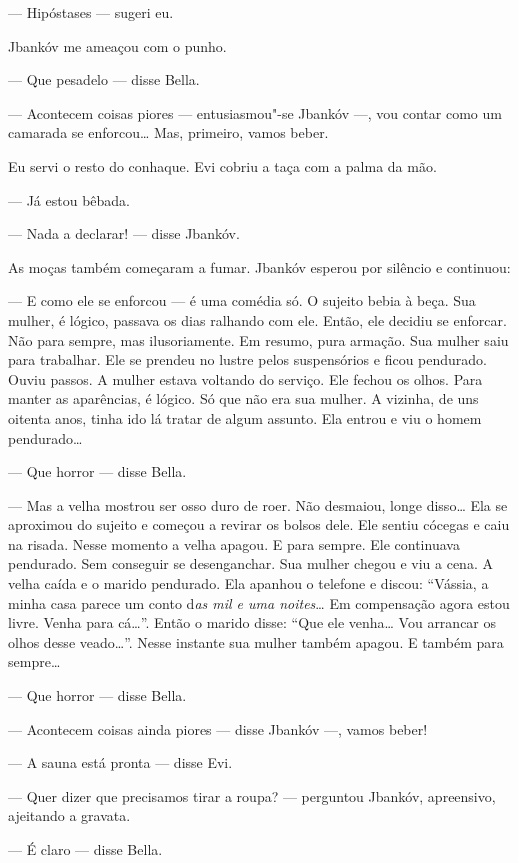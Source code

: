 --- Hipóstases --- sugeri eu.

Jbankóv me ameaçou com o punho.

--- Que pesadelo --- disse Bella.

--- Acontecem coisas piores --- entusiasmou"-se Jbankóv
---, vou contar como um camarada se enforcou\ldots{} Mas, primeiro,
vamos beber.

Eu servi o resto do conhaque. Evi cobriu a taça com a palma da mão.

--- Já estou bêbada.

--- Nada a declarar! --- disse Jbankóv.

As moças também começaram a fumar. Jbankóv esperou por silêncio e
continuou:

--- E como ele se enforcou --- é uma comédia só. O sujeito
bebia à beça. Sua mulher, é lógico, passava os dias ralhando com ele.
Então, ele decidiu se enforcar. Não para sempre, mas ilusoriamente. Em
resumo, pura armação. Sua mulher saiu para trabalhar. Ele se prendeu no
lustre pelos suspensórios e ficou pendurado. Ouviu passos. A mulher
estava voltando do serviço. Ele fechou os olhos. Para manter as
aparências, é lógico. Só que não era sua mulher. A vizinha, de uns
oitenta anos, tinha ido lá tratar de algum assunto. Ela entrou e viu o
homem pendurado\ldots{}

--- Que horror --- disse Bella.

--- Mas a velha mostrou ser osso duro de roer. Não desmaiou,
longe disso\ldots{} Ela se aproximou do sujeito e começou a revirar os bolsos
dele. Ele sentiu cócegas e caiu na risada. Nesse momento a velha apagou.
E para sempre. Ele continuava pendurado. Sem conseguir se desenganchar.
Sua mulher chegou e viu a cena. A velha caída e o marido pendurado. Ela
apanhou o telefone e discou: ``Vássia, a minha casa parece um conto
d\emph{as mil e uma noites}\ldots{} Em compensação agora estou livre. Venha
para cá\ldots{}''. Então o marido disse: ``Que ele venha\ldots{} Vou arrancar os
olhos desse veado\ldots{}''. Nesse instante sua mulher também apagou. E
também para sempre\ldots{}

--- Que horror --- disse Bella.

--- Acontecem coisas ainda piores --- disse Jbankóv
---, vamos beber!

--- A sauna está pronta --- disse Evi.

--- Quer dizer que precisamos tirar a roupa? --- perguntou
Jbankóv, apreensivo, ajeitando a gravata.

--- É claro --- disse Bella.

